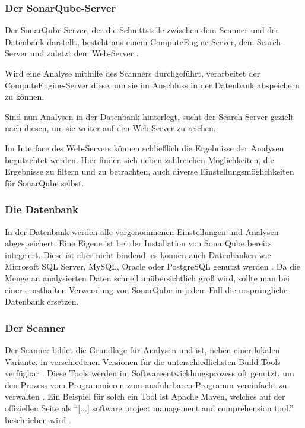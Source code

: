 \subsubsection{Der SonarQube-Server}

Der SonarQube-Server, der die Schnittstelle zwischen dem Scanner und der Datenbank darstellt, besteht aus einem \glqq ComputeEngine-Server\grqq{}, dem \glqq Search-Server\grqq{} und zuletzt dem \glqq Web-Server\grqq{} \autocite[Vgl.][]{dotnetpro}.

Wird eine Analyse mithilfe des Scanners durchgeführt, verarbeitet der ComputeEngine-Server diese, um sie im Anschluss in der Datenbank abspeichern zu können.

Sind nun Analysen in der Datenbank hinterlegt, sucht der Search-Server gezielt nach diesen, um sie weiter auf den Web-Server zu reichen.

Im Interface des Web-Servers können schließlich die Ergebnisse der Analysen begutachtet werden. Hier finden sich neben zahlreichen Möglichkeiten, die Ergebnisse zu filtern und zu betrachten, auch diverse Einstellungsmöglichkeiten für SonarQube selbst.

\subsubsection{Die Datenbank}

In der Datenbank werden alle vorgenommenen Einstellungen und Analysen abgespeichert. Eine Eigene ist bei der Installation von SonarQube bereits integriert. Diese ist aber nicht bindend, es können auch Datenbanken wie Microsoft SQL Server, MySQL, Oracle oder PostgreSQL genutzt werden \autocite[Vgl.][]{SonarRequirements}. Da die Menge an analysierten Daten schnell unübersichtlich groß wird, sollte man bei einer ernsthaften Verwendung von SonarQube in jedem Fall die ursprüngliche Datenbank ersetzen.

\subsubsection{Der Scanner}

Der Scanner bildet die Grundlage für Analysen und ist, neben einer lokalen Variante, in verschiedenen Versionen für die unterschiedlichsten Build-Tools verfügbar \autocite[Vgl.][]{VerschScanner}. Diese Tools werden im Softwareentwicklungsprozess oft genutzt, um den Prozess vom Programmieren zum ausführbaren Programm vereinfacht zu verwalten \autocite[Vgl.][]{BuildTools}. Ein Beispiel für solch ein Tool ist Apache Maven, welches auf der offiziellen Seite als \enquote{[...] software project management and comprehension tool.} beschrieben wird \autocite{Maven}.

